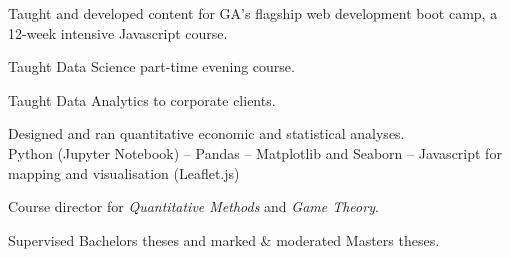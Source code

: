 \documentclass[a4paper,nomath]{deedy-resume} %
\begin{document}
\begin{paracol}{2}
\begin{tightitemize}
    \end{tightitemize}
    
    \sectionspace %
    

    \vspace{\topsep} %
    \begin{tightitemize}
        \item Taught and developed content for GA's flagship web development
          boot camp, a 12-week intensive Javascript course.
        \\
        \item Taught Data Science part-time evening course.\\
        \item Taught Data Analytics to corporate clients.\\
        
    \end{tightitemize}
    
    \sectionspace %


    \vspace{\topsep} %
    \begin{tightitemize}
        \item Designed and ran quantitative economic and statistical analyses.\\
        Python (Jupyter Notebook) -- Pandas -- Matplotlib and Seaborn -- Javascript for mapping and visualisation (Leaflet.js)
        
    \end{tightitemize}
    
    \sectionspace %

    \newpage

    \vspace{\topsep} %
    \begin{tightitemize}
        \item Course director for \textit{Quantitative Methods} and \textit{Game Theory}.
        \item Supervised Bachelors theses and marked \& moderated Masters theses.
        

\end{tightitemize}
\end{paracol}
\end{document}
